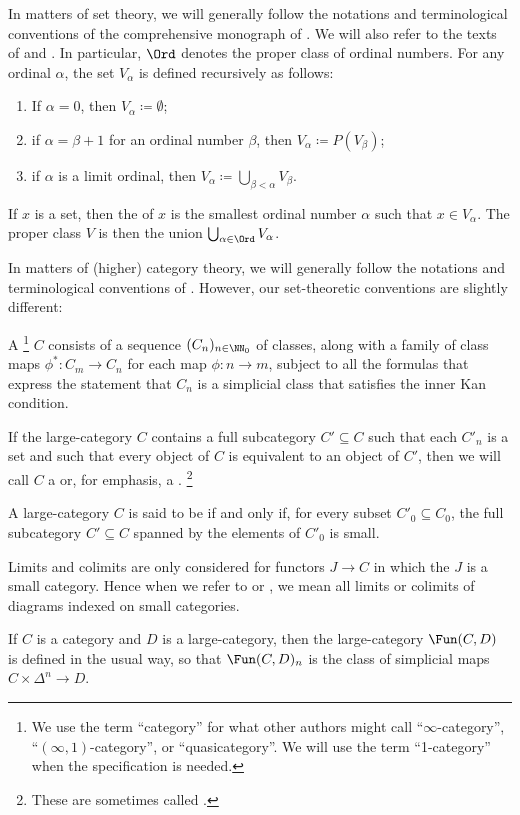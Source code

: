 In matters of set theory,
we will generally follow the notations and terminological conventions
of the comprehensive monograph of \cite{Jech2003}.
We will also refer to the texts of \cite{Drake1974} and \cite{Kanamori2009}.
In particular, $ \Ord $ denotes the proper class of ordinal numbers.
For any ordinal $ \alpha $, the set $ V_{\alpha} $ is defined recursively as follows:
\begin{enumerate}
	\item If $ \alpha = 0 $, then $ V_{\alpha} \coloneq \emptyset $;
	\item if $ \alpha = \beta + 1 $ for an ordinal number $ \beta $, then $ V_{\alpha} \coloneq P(V_{\beta}) $;
	\item if $ \alpha $ is a limit ordinal, then $ V_{\alpha} \coloneq \bigcup_{\beta < \alpha} V_{\beta} $.
\end{enumerate}
If $ x $ is a set, then the  of $ x $ is the smallest ordinal number $ \alpha $ such that $ x \in V_{\alpha} $.
The proper class $ V $ is then the union $ \bigcup_{\alpha \in \Ord} V_{\alpha} $.

In matters of (higher) category theory,
we will generally follow the notations and terminological conventions
of \cite{Lurie2009}.
However, our set-theoretic conventions are slightly different:
\begin{definition}
	A %
	\footnote{We use the term \enquote{category}
		for what other authors might call
		\enquote{$ \infty $-category},
		\enquote{$(\infty,1)$-category}, or
		\enquote{quasicategory}.
		We will use the term \enquote{1-category}
	when the specification is needed.}
	$C$ consists of a sequence $(C_n)_{n\in\NN_0}$ of classes,
	along with a family of class maps $ \phi^{\ast} \colon C_m \to C_n $
	for each map $ \phi \colon n \to m $,
	subject to all the formulas that express the statement that $C_n$ is a simplicial class
	that satisfies the inner Kan condition.

	If the large-category $C$ contains a full subcategory $ C' \subseteq C $
	such that each $ C'_n $ is a set and
	such that every object of $ C $ is equivalent to an object of $ C' $,
	then we will call $ C $ a 
	or, for emphasis, a .%
	\footnote{These are sometimes called .}
	
	A large-category $ C $ is said to be  if and only if,
	for every subset $ C'_0 \subseteq C_0$,
	the full subcategory $ C' \subseteq C $ spanned by the elements of $ C'_0 $ is small.
	
	Limits and colimits are only considered for functors $ J \to C $ in which
	the $ J $ is a small category.
	Hence when we refer to  or ,
	we mean all limits or colimits of diagrams indexed on small categories.
	
	If $ C $ is a category and $ D $ is a large-category, 
	then the large-category $ \Fun(C, D) $ is defined in the usual way,
	so that $ \Fun(C, D)_n $ is the class of simplicial maps
	$ C \times \Delta^n \to D $.
\end{definition}

